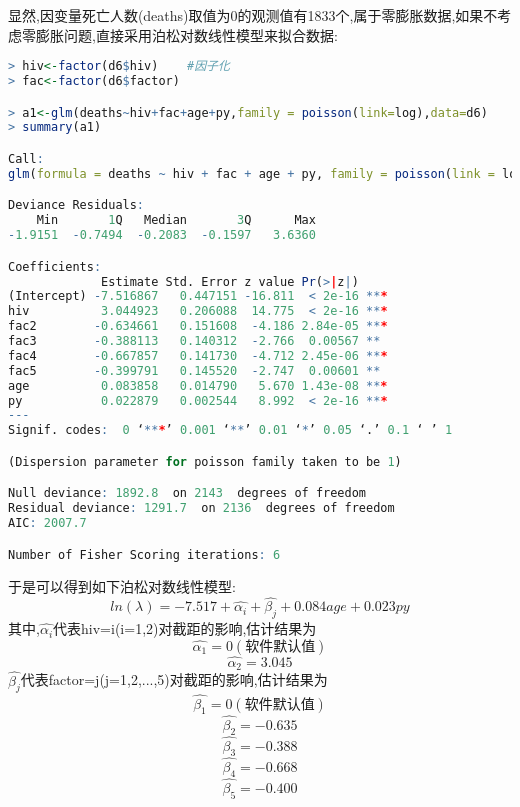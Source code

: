 \documentclass[11pt,a4paper,oneside]{book}
\begin{document}
显然,因变量死亡人数(deaths)取值为0的观测值有1833个,属于零膨胀数据,如果不考虑零膨胀问题,直接采用泊松对数线性模型来拟合数据:
\begin{lstlisting}[language=r]
> hiv<-factor(d6$hiv)    #因子化
> fac<-factor(d6$factor)

> a1<-glm(deaths~hiv+fac+age+py,family = poisson(link=log),data=d6)
> summary(a1)

Call:
glm(formula = deaths ~ hiv + fac + age + py, family = poisson(link = log),data = d6)

Deviance Residuals: 
    Min       1Q   Median       3Q      Max  
-1.9151  -0.7494  -0.2083  -0.1597   3.6360  

Coefficients:
             Estimate Std. Error z value Pr(>|z|)    
(Intercept) -7.516867   0.447151 -16.811  < 2e-16 ***
hiv          3.044923   0.206088  14.775  < 2e-16 ***
fac2        -0.634661   0.151608  -4.186 2.84e-05 ***
fac3        -0.388113   0.140312  -2.766  0.00567 ** 
fac4        -0.667857   0.141730  -4.712 2.45e-06 ***
fac5        -0.399791   0.145520  -2.747  0.00601 ** 
age          0.083858   0.014790   5.670 1.43e-08 ***
py           0.022879   0.002544   8.992  < 2e-16 ***
---
Signif. codes:  0 ‘***’ 0.001 ‘**’ 0.01 ‘*’ 0.05 ‘.’ 0.1 ‘ ’ 1

(Dispersion parameter for poisson family taken to be 1)

Null deviance: 1892.8  on 2143  degrees of freedom
Residual deviance: 1291.7  on 2136  degrees of freedom
AIC: 2007.7

Number of Fisher Scoring iterations: 6
\end{lstlisting}
于是可以得到如下泊松对数线性模型:
\[ln(\lambda)=-7.517+\hat{\alpha_i}+\hat{\beta_j}+0.084age+0.023py\]
其中,$ \hat{\alpha_i} $代表hiv=i(i=1,2)对截距的影响,估计结果为
\[\hat{\alpha_1}=0(\mbox{软件默认值})\]
\[\hat{\alpha_2}=3.045\]
$ \hat{\beta_j} $代表factor=j(j=1,2,...,5)对截距的影响,估计结果为
\[\hat{\beta_1}=0(\mbox{软件默认值})\]
\[\hat{\beta_2}=-0.635\]
\[\hat{\beta_3}=-0.388\]
\[\hat{\beta_4}=-0.668\]
\[\hat{\beta_5}=-0.400\]
\end{document}
